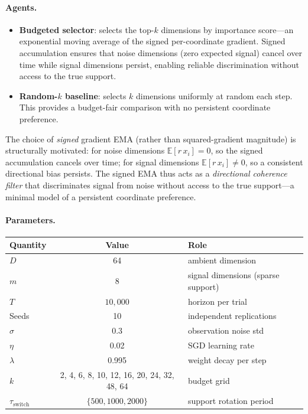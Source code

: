\documentclass[12pt]{article}
\begin{document}
\paragraph{Agents.}
\begin{itemize}
\item \textbf{Budgeted selector}: selects the top-$k$
  dimensions by importance score---an exponential moving
  average of the signed per-coordinate gradient.  Signed
  accumulation ensures that noise dimensions (zero expected
  signal) cancel over time while signal dimensions persist,
  enabling reliable discrimination without access to the true
  support.
\item \textbf{Random-$k$ baseline}: selects $k$ dimensions
  uniformly at random each step.  This provides a
  budget-fair comparison with no persistent coordinate preference.
\end{itemize}

\noindent
The choice of \emph{signed} gradient EMA (rather than
squared-gradient magnitude) is structurally motivated:
for noise dimensions $\mathbb{E}[r\,x_i] = 0$, so the
signed accumulation cancels over time; for signal
dimensions $\mathbb{E}[r\,x_i] \neq 0$, so a consistent
directional bias persists.  The signed EMA thus acts as a
\emph{directional coherence filter} that discriminates
signal from noise without access to the true support---a
minimal model of a persistent coordinate preference.

\paragraph{Parameters.}
\begin{center}
\small
\begin{tabular}{@{}lcl@{}}
\toprule
\textbf{Quantity} & \textbf{Value} & \textbf{Role} \\
\midrule
$D$ & 64 & ambient dimension \\
$m$ & 8  & signal dimensions (sparse support) \\
$T$ & $10{,}000$ & horizon per trial \\
Seeds & 10 & independent replications \\
$\sigma$ & 0.3 & observation noise std \\
$\eta$ & 0.02 & SGD learning rate \\
$\lambda$ & 0.995 & weight decay per step \\
$k$ & 2, 4, 6, 8, 10, 12, 16, 20, 24, 32, 48, 64
  & budget grid \\
$\tau_{\mathrm{switch}}$ & $\{500, 1000, 2000\}$
  & support rotation period \\
\bottomrule
\end{tabular}
\end{center}
\end{document}
